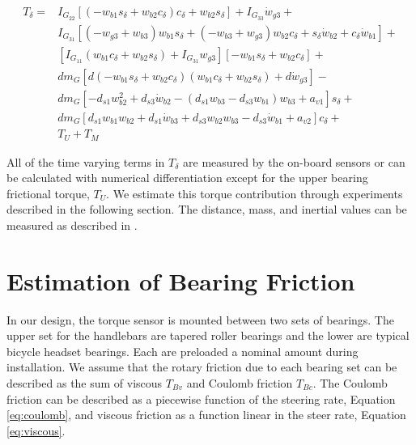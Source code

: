 \documentclass[a4paper]{article}
\begin{document}
\begin{align}
  T_{\delta} =
    & I_{G_{22}} \left[ \left( -w_{b1} s_\delta + w_{b2} c_\delta \right)
      c_\delta + w_{b2} s_\delta \right] + I_{G_{33}} \dot{w}_{g3} + \nonumber \\
    & I_{G_{31}} \left[ (-w_{g3} + w_{b3} ) w_{b1} s_\delta +
      (-w_{b3} + w_{g3}) w_{b2} c_\delta +
      s_\delta \dot{w}_{b2} + c_\delta \dot{w}_{b1} \right] + \nonumber \\
    & \left[ I_{G_{11}} (w_{b1} c_\delta + w_{b2}s_\delta) +
      I_{G_{31}} w_{g3} \right] \left[-w_{b1} s_\delta +
      w_{b2} c_\delta \right] + \nonumber \\
    & d m_G \left[ d (-w_{b1} s_\delta + w_{b2} c_\delta)
      (w_{b1} c_\delta + w_{b2} s_\delta) + d \dot{w}_{g3} \right] - \nonumber \\
    & d m_G \left[-d_{s1} w_{b2}^{2} + d_{s3} \dot{w}_{b2} -
      (d_{s1} w_{b3} - d_{s3} w_{b1}) w_{b3} + a_{v1} \right] s_\delta + \nonumber \\
    & d m_G \left[d_{s1} w_{b1} w_{b2} + d_{s1} \dot{w}_{b3} +
      d_{s3} w_{b2} w_{b3} - d_{s3} \dot{w}_{b1} + a_{v2} \right]
      c_\delta + \nonumber \\
    & T_U + T_M
\end{align}

All of the time varying terms in $T_\delta$ are measured by the on-board
sensors or can be calculated with numerical differentiation except for the
upper bearing frictional torque, $T_U$. We estimate this torque contribution
through experiments described in the following section. The distance, mass, and
inertial values can be measured as described in \cite{Moore2012}.

\section*{Estimation of Bearing Friction}
\label{sec:bearing-friction}

In our design, the torque sensor is mounted between two sets of bearings. The
upper set for the handlebars are tapered roller bearings and the lower are
typical bicycle headset bearings. Each are preloaded a nominal amount during
installation. We assume that the rotary friction due to each bearing set can be
described as the sum of viscous $T_{Bv}$ and Coulomb friction $T_{Bc}$. The
Coulomb friction can be described as a piecewise function of the steering rate,
Equation \ref{eq:coulomb}, and viscous friction as a function linear in the
steer rate, Equation \ref{eq:viscous}.
\end{document}
